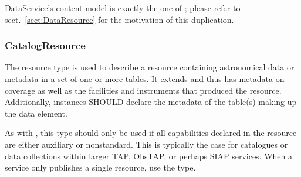 \documentclass[11pt,a4paper]{ivoa}
\begin{document}
DataService's content model is exactly the one of
; please refer to sect.~\ref{sect:DataResource}
for the motivation of this duplication.




\subsubsection{CatalogResource}
\label{sect:CatalogResource}


The  resource type is used to describe a
resource containing astronomical data or metadata in a set of one or
more tables.  It extends  and thus has metadata
on coverage as well as the facilities and instruments that produced the
resource.  Additionally,  instances SHOULD
declare the metadata of the table(s) making up the data
 element.

As with , this type should only be used if all
capabilities declared in the resource are either auxiliary or
nonstandard.  This is typically the case for catalogues or data
collections within larger TAP, ObsTAP, or perhaps SIAP services.  When
a service only publishes a single resource, use the
 type.
\end{document}
